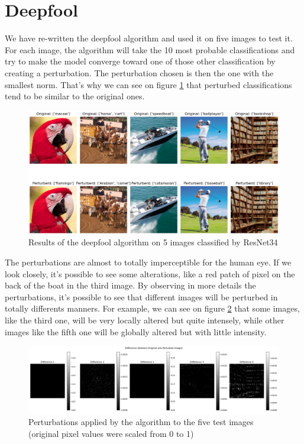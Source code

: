 \documentclass{article}
\begin{document}
\section{Deepfool}


We have re-written the deepfool algorithm and used it on five images to test it. For each image, the algorithm will take the 10 most probable classifications and try to make the model converge toward one of those other classification by creating a perturbation. The perturbation chosen is then the one with the smallest norm. That's why we can see on figure \ref{fig:result_global_deepfool} that perturbed classifications tend to be similar to the original ones.

\begin{figure}[H]
    \centering
    \includegraphics[width=1\linewidth]{results/result_pert_global.png}
    \caption{Results of the deepfool algorithm on 5 images classified by ResNet34}
    \label{fig:result_global_deepfool}
\end{figure}

The perturbations are almost to totally imperceptible for the human eye. If we look closely, it's possible to see some alterations, like a red patch of pixel on the back of the boat in the third image. By observing in more details the perturbations, it's possible to see that different images will be perturbed in totally differents manners. For example, we can see on figure \ref{fig:diff_global_grey} that some images, like the third one, will be very locally altered but quite intensely, while other images like the fifth one will be globally altered but with little intensity.

\begin{figure}[H]
    \centering
    \includegraphics[width=1\linewidth]{results/Diff_global_rescal.png}
    \caption{Perturbations applied by the algorithm to the five test images (original pixel values were scaled from 0 to 1)}
    \label{fig:diff_global_grey}
\end{figure}
\end{document}
